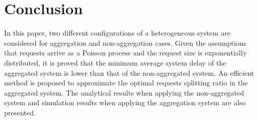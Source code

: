 \documentclass[10pt,journal]{IEEEtran}
\begin{document}
\section{Conclusion}\label{sec4}
In this paper, two different configurations of a heterogeneous system are considered for aggregation and non-aggregation cases. Given the assumptions that requests arrive as a Poisson process and the request size is exponentially distributed, it is proved that the minimum average system delay of the aggregated system is lower than that of the non-aggregated system. An efficient method is proposed to approximate the optimal requests splitting ratio in the aggregated system. The analytical results when applying the non-aggregated system and simulation results when applying the aggregation system are also presented.





\end{document}
